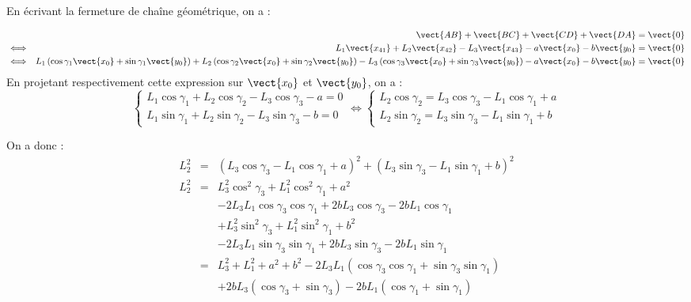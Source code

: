 \begin{multicols}{2}
\ifprof
\begin{corrige}
En écrivant la fermeture de chaîne géométrique, on a : 

\begin{eqnarray*}
&& \vect{AB}+\vect{BC}+\vect{CD} + \vect{DA} = \vect{0} \\
& \Longleftrightarrow& L_1\vect{x_{41}} + L_2\vect{x_{42}} - L_3\vect{x_{43}}
- a\vect{x_{0}}-b\vect{y_{0}} = \vect{0}\\
& \Longleftrightarrow&  
L_1\left(\cos\gamma_{1}\vect{x_0}+ \sin\gamma_{1}\vect{y_0}\right) + L_2\left(\cos\gamma_{2}\vect{x_0}+ \sin\gamma_{2}\vect{y_0}\right)
-L_3\left(\cos\gamma_{3}\vect{x_0}+ \sin\gamma_{3}\vect{y_0}\right)
- a\vect{x_{0}}-b\vect{y_{0}} = \vect{0}\\
\end{eqnarray*}
En projetant respectivement cette expression sur $\vect{x_0}$ et $\vect{y_0}$, on a : 
$$
\left\{
\begin{array}{l}
L_1 \cos\gamma_{1} + L_2 \cos\gamma_{2} 
-L_3\cos\gamma_{3} - a= 0\\
L_1 \sin\gamma_{1} + L_2 \sin\gamma_{2}
-L_3 \sin\gamma_{3} -b=0
\end{array}
\right.
\Longleftrightarrow
\left\{
\begin{array}{l}
L_2 \cos\gamma_{2} =L_3\cos\gamma_{3}- L_1 \cos\gamma_{1} + a  \\
L_2 \sin\gamma_{2} = L_3 \sin\gamma_{3}-L_1 \sin\gamma_{1} + b
\end{array}
\right.
$$

On a donc : 
\begin{eqnarray*}
L_2^2 &=& \left( L_3\cos\gamma_{3}- L_1 \cos\gamma_{1} + a  \right)^2
+ \left( L_3 \sin\gamma_{3}-L_1 \sin\gamma_{1} + b\right)^2 \\
L_2^2 &=& 
L_3^2\cos^2\gamma_{3}+ L_1^2 \cos^2\gamma_{1} + a^2 \\
&&-2  L_3 L_1\cos\gamma_{3} \cos\gamma_{1}
+2 b L_3 \cos\gamma_{3}
-2bL_1 \cos\gamma_{1}\\
&&+L_3^2 \sin^2\gamma_{3}+ L_1^2 \sin^2\gamma_{1} + b^2 \\
&&-2  L_3 L_1 \sin\gamma_{3} \sin\gamma_{1}
+2 b L_3 \sin\gamma_{3}
-2bL_1 \sin\gamma_{1}\\
& = & L_3^2+ L_1^2  + a^2+ b^2  
-2  L_3 L_1\left( \cos\gamma_{3} \cos\gamma_{1} + \sin\gamma_{3} \sin\gamma_{1} \right)\\
&& +2 b L_3 \left( \cos\gamma_{3} + \sin\gamma_{3}\right)
-2bL_1 \left( \cos\gamma_{1} + \sin\gamma_{1}\right)\\
\end{eqnarray*}
\end{corrige}
\else \fi





\ifprof
\else
\end{multicols}
\fi
